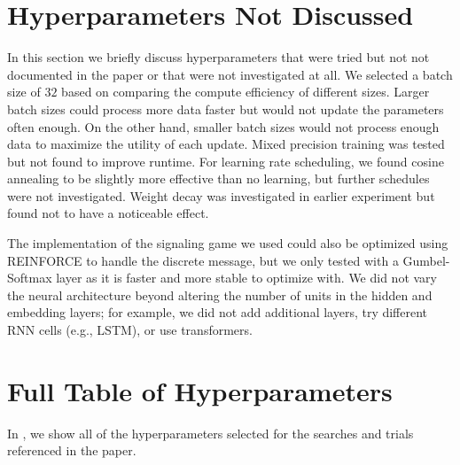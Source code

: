 \section{Hyperparameters Not Discussed}
\unskip\label{hpo:sec:not-discussed}
In this section we briefly discuss hyperparameters that were tried but not not documented in the paper or that were not investigated at all.
We selected a batch size of $32$ based on comparing the compute efficiency of different sizes.
Larger batch sizes could process more data faster but would not update the parameters often enough.
On the other hand, smaller batch sizes would not process enough data to maximize the utility of each update.
Mixed precision training was tested but not found to improve runtime.
For learning rate scheduling, we found cosine annealing to be slightly more effective than no learning, but further schedules were not investigated.
Weight decay was investigated in earlier experiment but found not to have a noticeable effect.

The implementation of the signaling game we used could also be optimized using REINFORCE to handle the discrete message, but we only tested with a Gumbel-Softmax layer as it is faster and more stable to optimize with.
We did not vary the neural architecture beyond altering the number of units in the hidden and embedding layers; for example, we did not add additional layers, try different RNN cells (e.g., LSTM), or use transformers.


\section{Full Table of Hyperparameters}
\unskip\label{hpo:sec:all-hparams}

In , we show all of the hyperparameters selected for the searches and trials referenced in the paper.

